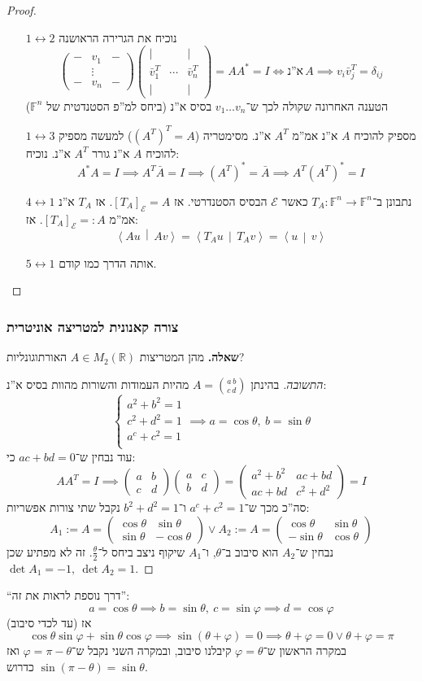 \documentclass[a4paper]{article}
\newcommand\R     {\mathbb{R}}
\newcommand\ec    {\mathcal{E}}
\newcommand\vphi  {\varphi}
\newcommand\ra    {\rangle}
\newcommand\la    {\langle}
\newcommand\ta    {\theta}
\newcommand\lra       {\leftrightarrow}
\newcommand\F         {\mathbb{F}}
\newcommand\co        {\colon}
\newcommand\pms[1]    {\begin{pmatrix}
		#1
\end{pmatrix}}
\newcommand\mut [2]   {\left \la #1 \,\middle\vert\, #2 \right \ra}
\newcommand\dg        {\delta}
\renewcommand\phi     {\varphi}
\theoremstyle{definition}
\begin{document}
	\begin{proof}\,
		\begin{itemize}
			\item[$1 \lra 2$] נוכיח את הגרירה הראושנה
			\[ \pms{- & v_1 & - \\ & \vdots \\ - & v_n & -}\pms{\vert & & \vert\\ \bar v_1^T & \cdots & \bar v_n^T \\ \vert & & \vert} = AA^* = I \iff \text{א''נ}\, A \implies v_i \bar v_j^T = \dg_{ij} \] 
			הטענה האחרונה שקולה לכך ש־$v_1 \dots v_n$ בסיס א''נ (ביחס למ''פ הסטנדטית של $\F^n$)
			\item[$1 \lra 3$]מספיק להוכיח $A$ א''נ אמ''מ $A^T$ א''נ. מסימטריה ($(A^T)^T = A$) למעשה מספיק להוכיח $A$ א''נ גורר $A^T$ א''נ. נוכיח: 
			\[ A^*A = I \implies A^T\bar A = I \implies (A^T)^* = \bar A \implies A^T(A^T)^* = I \]
			\item[$4 \lra 1$]נתבונן ב־$T_A \co \F^n \to \F^n$ כאשר $\ec$ הבסיס הסטנדרטי. אז $[T_A]_{\ec} = A$. אז $T_A$ א''נ אמ''מ $[T_A]_{\ec} =: A$. אז: 
			\[ \mut{Au}{Av} = \mut{T_Au}{T_Av} = \mut{u}{v} \]
			\item[$5 \lra 1$] אותה הדרך כמו קודם. 
		\end{itemize}
	\end{proof}
	
	\subsubsection{צורה קאנונית למטריצה אוניטרית}
	\textbf{שאלה. }מהן המטריצות $A \in M_2(\R)$ האורתוגונליות? \begin{proof}[התשובה]
		בהינתן $A = \binom{a\, b}{c\, d}$ מהיות העמודות והשורות מהוות בסיס א''נ:
		\[ \begin{cases}
			a^2 + b^2 = 1 \\
			c^2 + d^2 = 1 \\
			a^c + c^2 = 1 \\
		\end{cases} \implies a = \cos\ta, \ b = \sin\ta \]
		עוד נבחין ש־$ac + bd = 0$ כי: 
		\[ AA^T = I \implies \pms{a & b \\ c & d}\pms{a & c \\ b & d} = \pms{a^2 + b^2 & ac + bd \\ ac + bd & c^2 + d^2} = I \]
		סה''כ מכך ש־$a^c + c^2 = 1$ ו־$b^2 + d^2 = 1$ נקבל שתי צורות אפשריות: 
		\[ A_1:= A = \pms{\cos\ta & \sin\ta \\ \sin\ta & -\cos\ta} \lor A_2:= A = \pms{\cos\ta&\sin\ta \\ -\sin\ta & \cos\ta} \]
		נבחין ש־$A_2$ הוא סיבוב ב־$\ta$, ו־$A_1$ שיקוף ניצב ביחס ל־$\frac{\ta}{2}$. זה לא מפתיע שכן $\det A_1 = -1, \ \det A_2 = 1$. 	
	\end{proof}
	``דרך נוספת לראות את זה'': 
	\[ a = \cos\ta \implies b = \sin\ta, \ c = \sin\vphi \implies d = \cos\vphi \]
	אז (עד לכדי סיבוב)
	\[ \cos\ta \sin\vphi + \sin\ta \cos\vphi \implies \sin(\ta + \phi) = 0 \implies \ta + \phi = 0 \lor \ta + \phi = \pi \]
	במקרה הראשון ש־$\phi = \ta$ קיבלנו סיבוב, ובמקרה השני נקבל ש־$\vphi = \pi - \ta$ ואז $\sin(\pi - \ta) = \sin \ta$ כדרוש. 
	
\end{document}
